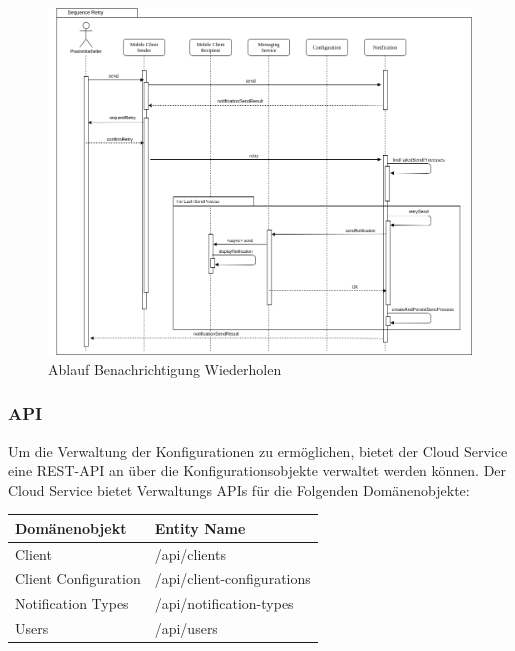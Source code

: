 \begin{figure}[h]
    \centering
    \begin{minipage}[b]{0.9\textwidth}
        \includegraphics[width=\textwidth]{graphics/Sequence_Notification_Retry}
        \caption{Ablauf Benachrichtigung Wiederholen}
    \end{minipage}
\end{figure}


\clearpage

\subsubsection{API}

Um die Verwaltung der Konfigurationen zu ermöglichen, bietet der Cloud Service eine REST-API an über die Konfigurationsobjekte verwaltet werden können.
Der Cloud Service bietet Verwaltungs APIs für die Folgenden Domänenobjekte:

\begin{table}[h]
    \centering
    \begin{tabular}{|l|p{13cm}|}
        \hline
        \textbf{Domänenobjekt} & \textbf{Entity Name} \\
        \hline
        Client         & /api/clients \\
        \hline
        Client Configuration         & /api/client-configurations \\
        \hline
        Notification Types         & /api/notification-types \\
        \hline
        Users         & /api/users \\
        \hline
    \end{tabular}\label{tab:adminapimethods}
\end{table}


